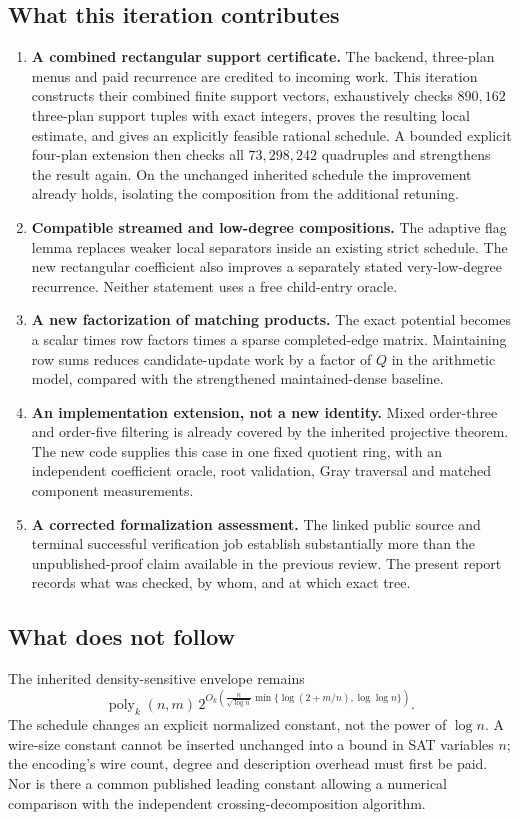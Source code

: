 \documentclass[11pt,letterpaper]{article}
\theoremstyle{remark}\newtheorem{remark}[theorem]{Remark}
\newcommand{\poly}{\operatorname{poly}}\newcommand{\vTwo}{v_2}\newcommand{\ceil}[1]{\left\lceil#1\right\rceil}\newcommand{\floor}[1]{\left\lfloor#1\right\rfloor}\newcommand{\LL}{\mathcal L}
\begin{document}
\subsection{What this iteration contributes}
\begin{enumerate}
\item \textbf{A combined rectangular support certificate.} The backend, three-plan menus and paid recurrence are credited to incoming work. This iteration constructs their combined finite support vectors, exhaustively checks $890{,}162$ three-plan support tuples with exact integers, proves the resulting local estimate, and gives an explicitly feasible rational schedule. A bounded explicit four-plan extension then checks all $73{,}298{,}242$ quadruples and strengthens the result again. On the unchanged inherited schedule the improvement already holds, isolating the composition from the additional retuning.
\item \textbf{Compatible streamed and low-degree compositions.} The adaptive flag lemma replaces weaker local separators inside an existing strict schedule. The new rectangular coefficient also improves a separately stated very-low-degree recurrence. Neither statement uses a free child-entry oracle.
\item \textbf{A new factorization of matching products.} The exact potential becomes a scalar times row factors times a sparse completed-edge matrix. Maintaining row sums reduces candidate-update work by a factor of $Q$ in the arithmetic model, compared with the strengthened maintained-dense baseline.
\item \textbf{An implementation extension, not a new identity.} Mixed order-three and order-five filtering is already covered by the inherited projective theorem. The new code supplies this case in one fixed quotient ring, with an independent coefficient oracle, root validation, Gray traversal and matched component measurements.
\item \textbf{A corrected formalization assessment.} The linked public source and terminal successful verification job establish substantially more than the unpublished-proof claim available in the previous review. The present report records what was checked, by whom, and at which exact tree.
\end{enumerate}

\subsection{What does not follow}
The inherited density-sensitive envelope remains
\begin{equation}\label{eq:sat}
 \poly_k(n,m)\,
 2^{O_k\!\left(\frac{n}{\sqrt{\log n}}
     \min\{\log(2+m/n),\log\log n\}\right)}.
\end{equation}
The schedule changes an explicit normalized constant, not the power of $\log n$. A wire-size constant cannot be inserted unchanged into a bound in SAT variables $n$; the encoding's wire count, degree and description overhead must first be paid. Nor is there a common published leading constant allowing a numerical comparison with the independent crossing-decomposition algorithm.
\end{document}
